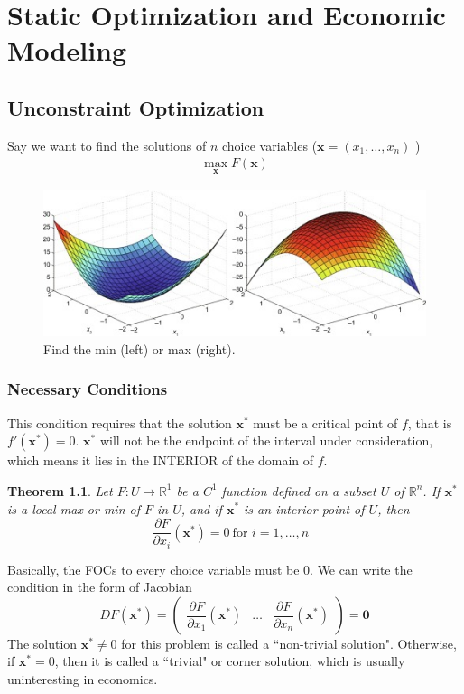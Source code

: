 \documentclass[11pt,a4paper]{book}
\newtheorem{theorem}{Theorem}[section]
\theoremstyle{definition}\newtheorem{definition}{Definition}
\theoremstyle{definition}\newtheorem{fact}{Fact}
\theoremstyle{definition}\newtheorem{remark}{Remark}
\theoremstyle{definition}\newtheorem{ex}{Ex.}
\theoremstyle{definition}\newtheorem{project}{Project}
\theoremstyle{definition}\newtheorem{problem}{Problem}
\theoremstyle{definition}\newtheorem{example}{Example}
\newenvironment{ftheorem}
{\begin{mdframed}\begin{theorem}}
		{\end{theorem}\end{mdframed}}
\numberwithin{theorem}{section}
\numberwithin{corollary}{chapter}
\numberwithin{assumption}{chapter}
\numberwithin{definition}{chapter}
\numberwithin{prop}{chapter}
\numberwithin{notation}{chapter}
\numberwithin{problem}{chapter}
\numberwithin{example}{chapter}
\numberwithin{fact}{chapter}
\numberwithin{ex}{chapter}
\def\R{\mathbb R}
\def\0{\mathbf 0}
\def\R{\mathbb R}
\def\x{\mathbf x}
\begin{document}
	\chapter{Static Optimization and Economic Modeling}
	\section{Unconstraint Optimization}
	Say we want to find the solutions of $n$ choice variables ($\x = (x_1, \dots, x_n)$ )
	\begin{align*}
		\max_{\x} F(\x) 
	\end{align*}
	
	\begin{figure}[ht]
		\centering
		\includegraphics[scale=1]{figs/maxmin.jpg}
		\caption{Find the min (left) or max (right).}
	\end{figure}
	
	\subsection{Necessary Conditions}
	This condition requires that the solution $\x^*$ must be a critical point of $f$, that is $f'(\x^*)=0$. $\x^*$ will not be the endpoint of the interval under consideration, which means it lies in the INTERIOR of the domain of $f$. 
	
	\begin{ftheorem}
		Let $F: U \mapsto \R^1$ be a $C^1$ function defined on a subset $U$ of $\R^n$. If $\x^*$ is a local max or min of $F$ in $U$, and if $\x^*$ is an interior point of $U$, then
		\begin{equation*}
			\frac{\partial F}{\partial x_i} (\x^*) = 0 \ \text{for $i = 1, \dots, n$ }
		\end{equation*}
	\end{ftheorem}
	Basically, the FOCs to every choice variable must be 0. We can write the condition in the form of Jacobian
	\begin{equation*}
		D F(\x^*) = 
		\begin{pmatrix}
			\dfrac{\partial F}{\partial x_1} (\x^*)            & \dots  & \dfrac{\partial F}{ \partial x_n} (\x^*) 
		\end{pmatrix} = \0
	\end{equation*}
	The solution $\x^* \neq 0$ for this problem is called a ``non-trivial solution". Otherwise, if $\x^* = 0$, then it is called a ``trivial" or corner solution, which is usually uninteresting in economics.
	
\end{document}
